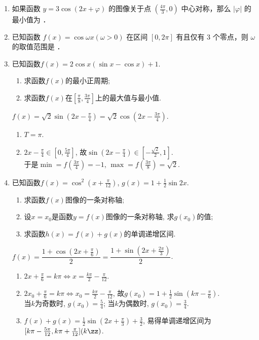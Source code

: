 \begin{enumerate}
\item 如果函数 $y=3 \cos (2 x+\varphi)$ 的图像关于点 $\left(\frac{4 \pi}{3}, 0\right)$ 中心对称，那么 $|\varphi|$ 的最小值为 ．

\item 已知函数 $f(x)=\cos \omega x(\omega>0)$ 在区间 $[0,2 \pi]$ 有且仅有 3 个零点，则 $\omega$ 的取值范围是 \blkda[2]{$[\dfrac{5}{4},\dfrac{7}{4})$} ．

\item 已知函数$f(x)=2\cos{x}(\sin{x}-\cos{x})+1$. 
\begin{enumerate}[(1)]
\item 求函数$f(x)$的最小正周期; 
\item 求函数$f(x)$在$[\frac{\pi}{8},\frac{3\pi}{4}]$上的最大值与最小值. 
\end{enumerate}
\begin{jieda}
$f(x)=\sqrt{2}\sin(2x-\frac{\pi}{4})=\sqrt{2}\cos(2x-\frac{3\pi}{4})$. 
\begin{enumerate}[(1)]
\item $T=\pi$. 
\item $2x-\frac{\pi}{4}\in[0,\frac{5\pi}{4}]$, 故$\sin(2x-\frac{\pi}{4})\in[-\frac{\sqrt{2}}{2},1]$. \\
于是$\min=f(\frac{3\pi}{4})=-1$, $\max=f(\frac{3\pi}{8})=\sqrt{2}$. 
\end{enumerate}
\end{jieda}

\item 已知函数$f(x)=\cos^2\left(x+\frac{\pi}{12}\right)$, $g(x)=1+\frac{1}{2}\sin2x$. 
\begin{enumerate}[(1)]
\item 求函数$f(x)$图像的一条对称轴; 
\item 设$x=x_0$是函数$y=f(x)$图像的一条对称轴, 求$g(x_0)$的值; 
\item 求函数$h(x)=f(x)+g(x)$的单调递增区间. 
\end{enumerate}
\begin{jieda}
$f(x)=\dfrac{1+\cos(2x+\frac{\pi}{6})}{2}=\dfrac{1+\sin(2x+\frac{2\pi}{3})}{2}$. 
\begin{enumerate}[(1)]
\item $2x+\frac{\pi}{6}=k\pi\iff x=\frac{k\pi}{2}-\frac{\pi}{12}$. 
\item $2x_0+\frac{\pi}{6}=k\pi\iff x_0=\frac{k\pi}{2}-\frac{\pi}{12}$, 故$g(x_0)=1+\frac{1}{2}\sin(k\pi-\frac{\pi}{6})$. \\
当$k$为奇数时, $g(x_0)=\frac{5}{4}$; 当$k$为偶数时, $g(x_0)=\frac{3}{4}$. 
\item $f(x)+g(x)=\frac{1}{2}\sin(2x+\frac{\pi}{3})+\frac{3}{2}$, 易得单调递增区间为$[k\pi-\frac{5\pi}{12},k\pi+\frac{\pi}{12}](k\zz)$. 
\end{enumerate}
\end{jieda}


\end{enumerate}
